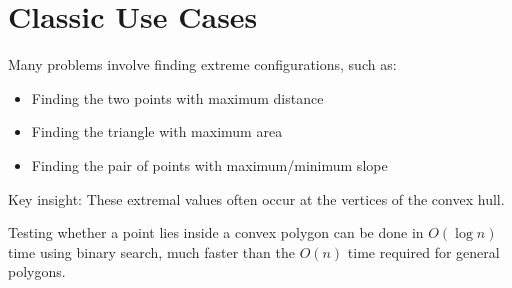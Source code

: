 \section{Classic Use Cases}
\begin{pattern}
Many problems involve finding extreme configurations, such as:
\begin{itemize}
    \item Finding the two points with maximum distance
    \item Finding the triangle with maximum area
    \item Finding the pair of points with maximum/minimum slope
\end{itemize}
Key insight: These extremal values often occur at the vertices of the convex hull.
\end{pattern}

\begin{pattern}
Testing whether a point lies inside a convex polygon can be done in $O(\log n)$ time using binary search, much faster than the $O(n)$ time required for general polygons.
\end{pattern}



